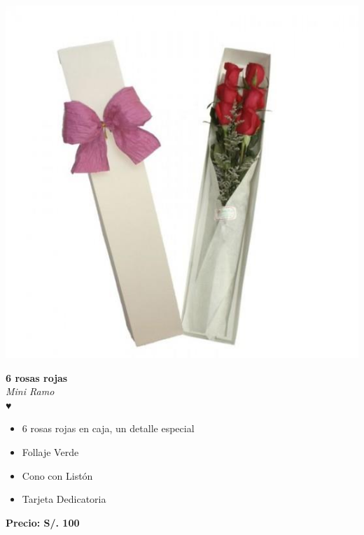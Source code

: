 \documentclass{article}
\begin{document}
\begin{minipage}{0.35\textwidth}
    \includegraphics[width=1.0\textwidth]{imagenes_extraidas/image_5_4}
\end{minipage}
\hspace{1cm}
\begin{minipage}{0.6\textwidth}
    \textcolor{cpred}{\textbf{\huge 6 rosas rojas }}\\
    {\textit{Mini Ramo}} \\
    \textcolor{cpred}{\Huge ♥} \\
    \vspace{0.5cm}
    \begin{itemize}
        \item 6 rosas rojas en caja, un detalle especial
        \item Follaje Verde
        \item Cono con Listón
        \item Tarjeta Dedicatoria
    \end{itemize}
\end{minipage}
\vspace{0.3cm}
\begin{center}
   \textbf{\Large Precio: \textcolor{cpred}{S/. 100 }}
\end{center}
\vspace{1cm}
\noindent
\end{document}
